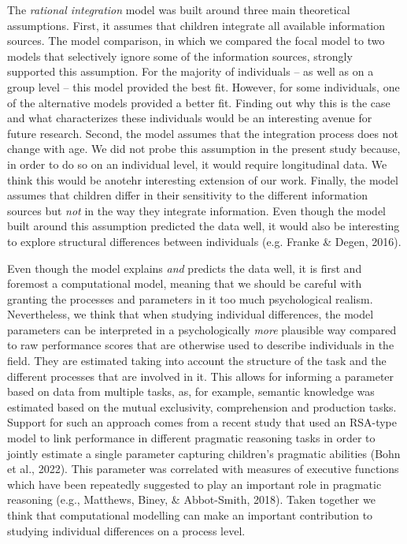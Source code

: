 \documentclass[
  man,floatsintext]{apa6}
\begin{document}
The \emph{rational integration} model was built around three main theoretical assumptions. First, it assumes that children integrate all available information sources. The model comparison, in which we compared the focal model to two models that selectively ignore some of the information sources, strongly supported this assumption. For the majority of individuals -- as well as on a group level -- this model provided the best fit. However, for some individuals, one of the alternative models provided a better fit. Finding out why this is the case and what characterizes these individuals would be an interesting avenue for future research. Second, the model assumes that the integration process does not change with age. We did not probe this assumption in the present study because, in order to do so on an individual level, it would require longitudinal data. We think this would be anotehr interesting extension of our work. Finally, the model assumes that children differ in their sensitivity to the different information sources but \emph{not} in the way they integrate information. Even though the model built around this assumption predicted the data well, it would also be interesting to explore structural differences between individuals (e.g. Franke \& Degen, 2016).

Even though the model explains \emph{and} predicts the data well, it is first and foremost a computational model, meaning that we should be careful with granting the processes and parameters in it too much psychological realism. Nevertheless, we think that when studying individual differences, the model parameters can be interpreted in a psychologically \emph{more} plausible way compared to raw performance scores that are otherwise used to describe individuals in the field. They are estimated taking into account the structure of the task and the different processes that are involved in it. This allows for informing a parameter based on data from multiple tasks, as, for example, semantic knowledge was estimated based on the mutual exclusivity, comprehension and production tasks. Support for such an approach comes from a recent study that used an RSA-type model to link performance in different pragmatic reasoning tasks in order to jointly estimate a single parameter capturing children's pragmatic abilities (Bohn et al., 2022). This parameter was correlated with measures of executive functions which have been repeatedly suggested to play an important role in pragmatic reasoning (e.g., Matthews, Biney, \& Abbot-Smith, 2018). Taken together we think that computational modelling can make an important contribution to studying individual differences on a process level.
\end{document}
